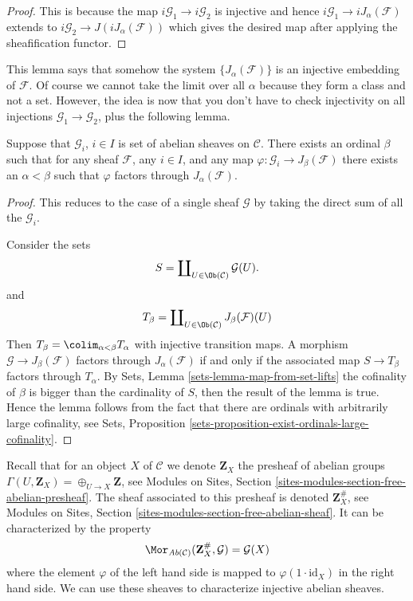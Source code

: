 \begin{proof}
This is because the map $i\mathcal{G}_1 \to i\mathcal{G}_2$ is injective
and hence $i\mathcal{G}_1 \to iJ_\alpha(\mathcal{F})$ extends to
$i\mathcal{G}_2 \to J(iJ_\alpha(\mathcal{F}))$ which gives the
desired map after applying the sheafification functor.
\end{proof}

\noindent
This lemma says that somehow the system $\{J_{\alpha}(\mathcal{F})\}$
is an injective embedding of $\mathcal{F}$. Of course
we cannot take the limit over all $\alpha$ because they form a class
and not a set. However, the idea is now that you don't have to check
injectivity on all injections $\mathcal{G}_1 \to \mathcal{G}_2$, plus
the following lemma.

\begin{lemma}
\label{lemma-map-into-smaller}
Suppose that $\mathcal{G}_i$, $i\in I$ is set of abelian sheaves
on $\mathcal{C}$. There exists an ordinal $\beta$ such that
for any sheaf $\mathcal{F}$, any $i\in I$, and any map
$\varphi : \mathcal{G}_i \to J_\beta(\mathcal{F})$ there exists an
$\alpha < \beta$ such that $ \varphi $ factors through
$J_\alpha(\mathcal{F})$.
\end{lemma}

\begin{proof}
This reduces to the case of a single sheaf $\mathcal{G}$
by taking the direct sum of all the $\mathcal{G}_i$.

\medskip\noindent
Consider the sets
$$
S = \coprod\nolimits_{U \in \Ob(\mathcal{C})} \mathcal{G}(U).
$$
and
$$
T_\beta
=
\coprod\nolimits_{U \in \Ob(\mathcal{C})} J_\beta(\mathcal{F})(U)
$$
Then $T_\beta = \colim_{\alpha < \beta} T_\alpha$
with injective transition maps.
A morphism $\mathcal{G} \to J_\beta(\mathcal{F})$ factors
through $J_\alpha(\mathcal{F})$ if and only if
the associated map $S \to T_\beta$ factors through $T_\alpha$.
By
Sets, Lemma \ref{sets-lemma-map-from-set-lifts}
the cofinality of $\beta$ is bigger than the cardinality
of $S$, then the result of the lemma is true. Hence the lemma
follows from the fact that there are ordinals with arbitrarily
large cofinality, see
Sets, Proposition \ref{sets-proposition-exist-ordinals-large-cofinality}.
\end{proof}

\noindent
Recall that for an object $X$ of $\mathcal{C}$ we denote $\mathbf{Z}_X$
the presheaf of abelian groups $\Gamma(U, \mathbf{Z}_X) =
\oplus_{U \to X} \mathbf{Z}$, see
Modules on Sites, Section \ref{sites-modules-section-free-abelian-presheaf}.
The sheaf associated to this presheaf
is denoted $\mathbf{Z}_X^\#$, see
Modules on Sites, Section \ref{sites-modules-section-free-abelian-sheaf}.
It can be characterized by
the property
\begin{equation}
\label{equation-free-sheaf-on}
\Mor_{\textit{Ab}(\mathcal{C})}(\mathbf{Z}_X^\#, \mathcal{G})
=
\mathcal{G}(X)
\end{equation}
where the element $\varphi$ of the left hand side is mapped
to $\varphi(1 \cdot \text{id}_X)$ in the right hand side. We can use these
sheaves to characterize injective abelian sheaves.


